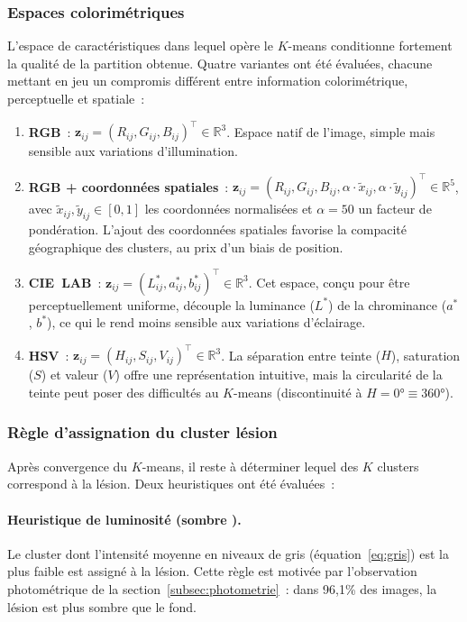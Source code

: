 \documentclass[12pt,a4paper]{article}
\newcommand{\R}{\mathbb{R}}
\begin{document}
\subsubsection{Espaces colorimétriques}
\label{subsubsec:espaces_couleur}

L'espace de caractéristiques dans lequel opère le $K$-means conditionne fortement la qualité de la partition obtenue. Quatre variantes ont été évaluées, chacune mettant en jeu un compromis différent entre information colorimétrique, perceptuelle et spatiale~:
\begin{enumerate}[nosep]
    \item \textbf{RGB}~: $\mathbf{z}_{ij} = (R_{ij}, G_{ij}, B_{ij})^\top \in \R^3$. Espace natif de l'image, simple mais sensible aux variations d'illumination.
    \item \textbf{RGB + coordonnées spatiales}~: $\mathbf{z}_{ij} = (R_{ij}, G_{ij}, B_{ij}, \alpha \cdot \tilde{x}_{ij}, \alpha \cdot \tilde{y}_{ij})^\top \in \R^5$, avec $\tilde{x}_{ij}, \tilde{y}_{ij} \in [0, 1]$ les coordonnées normalisées et $\alpha = 50$ un facteur de pondération. L'ajout des coordonnées spatiales favorise la compacité géographique des clusters, au prix d'un biais de position.
    \item \textbf{CIE~LAB}~: $\mathbf{z}_{ij} = (L^*_{ij}, a^*_{ij}, b^*_{ij})^\top \in \R^3$. Cet espace, conçu pour être perceptuellement uniforme, découple la luminance ($L^*$) de la chrominance ($a^*$, $b^*$), ce qui le rend moins sensible aux variations d'éclairage.
    \item \textbf{HSV}~: $\mathbf{z}_{ij} = (H_{ij}, S_{ij}, V_{ij})^\top \in \R^3$. La séparation entre teinte ($H$), saturation ($S$) et valeur ($V$) offre une représentation intuitive, mais la circularité de la teinte peut poser des difficultés au $K$-means (discontinuité à $H = 0° \equiv 360°$).
\end{enumerate}

\subsubsection{Règle d'assignation du cluster lésion}
\label{subsubsec:assignation}

Après convergence du $K$-means, il reste à déterminer lequel des $K$ clusters correspond à la lésion. Deux heuristiques ont été évaluées~:

\paragraph{Heuristique de luminosité (\og sombre \fg{}).} Le cluster dont l'intensité moyenne en niveaux de gris (équation~\ref{eq:gris}) est la plus faible est assigné à la lésion. Cette règle est motivée par l'observation photométrique de la section~\ref{subsec:photometrie}~: dans 96{,}1\% des images, la lésion est plus sombre que le fond.
\end{document}
